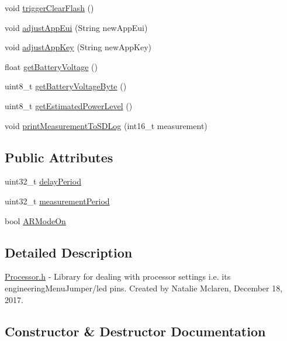 \begin{DoxyCompactItemize}
\item 
void \mbox{\hyperlink{class_processor_a8083069e032fcd6e38c97cc31475200a}{trigger\+Clear\+Flash}} ()
\item 
void \mbox{\hyperlink{class_processor_a9e5c642ce356b8aebe5998158f31ded5}{adjust\+App\+Eui}} (String new\+App\+Eui)
\item 
void \mbox{\hyperlink{class_processor_adee07912124face3700bc988606b8f38}{adjust\+App\+Key}} (String new\+App\+Key)
\item 
float \mbox{\hyperlink{class_processor_aa467c82cb9a57d597487fc319c878c36}{get\+Battery\+Voltage}} ()
\item 
uint8\+\_\+t \mbox{\hyperlink{class_processor_ae2385e41f86895199fb37e524a3f1e86}{get\+Battery\+Voltage\+Byte}} ()
\item 
uint8\+\_\+t \mbox{\hyperlink{class_processor_a78b74d3be91182a263f77ff0f250408d}{get\+Estimated\+Power\+Level}} ()
\item 
void \mbox{\hyperlink{class_processor_aa60b755d3022b3b0f83f654e2b7e2e1d}{print\+Measurement\+To\+S\+D\+Log}} (int16\+\_\+t measurement)
\end{DoxyCompactItemize}
\subsection*{Public Attributes}
\begin{DoxyCompactItemize}
\item 
uint32\+\_\+t \mbox{\hyperlink{class_processor_a3d4df57c57607d2ed3ad9f2d4ff3e789}{delay\+Period}}
\item 
uint32\+\_\+t \mbox{\hyperlink{class_processor_acd8bba113bac81f4c5695cba7c9dd146}{measurement\+Period}}
\item 
bool \mbox{\hyperlink{class_processor_af51b6b3ce7074068195b5d3eb2442fdb}{A\+R\+Mode\+On}}
\end{DoxyCompactItemize}


\subsection{Detailed Description}
\mbox{\hyperlink{_processor_8h}{Processor.\+h}} -\/ Library for dealing with processor settings i.\+e. its engineering\+Menu\+Jumper/led pins. Created by Natalie Mclaren, December 18, 2017. 

\subsection{Constructor \& Destructor Documentation}
\mbox{\label{class_processor_a9fdc4e6a92586eea32020a1f1e666ed6}} 
